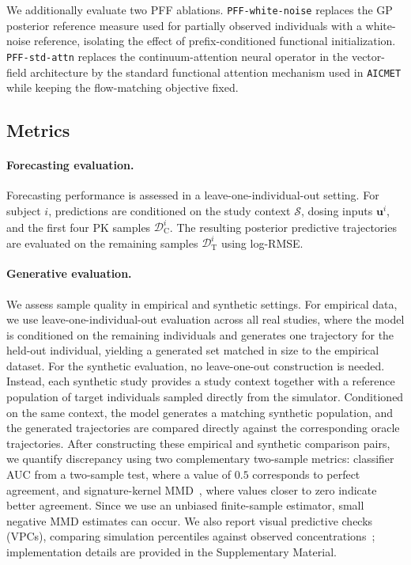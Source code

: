 We additionally evaluate two PFF ablations.
%
\texttt{PFF-white-noise} replaces the GP posterior reference measure used for partially observed individuals with a white-noise reference, isolating the effect of prefix-conditioned functional initialization.
%
\texttt{PFF-std-attn} replaces the continuum-attention neural operator in the vector-field architecture by the standard functional attention mechanism used in \texttt{AICMET} while keeping the flow-matching objective fixed.

\subsection{Metrics}

\paragraph{Forecasting evaluation.}
Forecasting performance is assessed in a leave-one-individual-out setting.
%
For subject $i$, predictions are conditioned on the study context $\mathcal{S}$, dosing inputs $\mathbf{u}^i$, and the first four PK samples $\mathcal{D}^i_{\mathrm{C}}$.
%
The resulting posterior predictive trajectories are evaluated on the remaining samples $\mathcal{D}^i_{\mathrm{T}}$ using log-RMSE.

\paragraph{Generative evaluation.}
We assess sample quality in empirical and synthetic settings.
%
For empirical data, we use leave-one-individual-out evaluation across all real studies, where the model is conditioned on the remaining individuals and generates one trajectory for the held-out individual, yielding a generated set matched in size to the empirical dataset.
%
For the synthetic evaluation, no leave-one-out construction is needed.
%
Instead, each synthetic study provides a study context together with a reference population of target individuals sampled directly from the simulator.
%
Conditioned on the same context, the model generates a matching synthetic population, and the generated trajectories are compared directly against the corresponding oracle trajectories.
After constructing these empirical and synthetic comparison pairs, we quantify discrepancy using two complementary two-sample metrics:
classifier AUC from a two-sample test, where a value of $0.5$ corresponds to perfect agreement, and signature-kernel MMD~\citep{kiraly2019kernels}, where values closer to zero indicate better agreement. Since we use an unbiased finite-sample estimator, small negative MMD estimates can occur.
%
We also report visual predictive checks (VPCs), comparing simulation percentiles against observed concentrations~\citep{holford2005}; implementation details are provided in the Supplementary Material.

